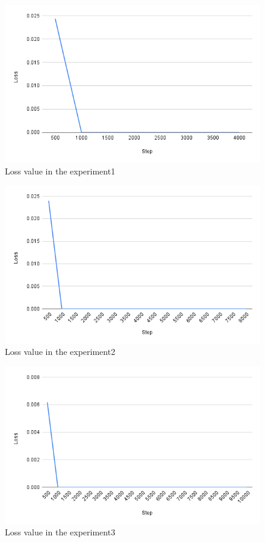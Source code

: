 \begin{figure}[h]
  \centering
  \includegraphics[keepaspectratio, scale=0.5]{images/exp1-4000.png}
  \caption{Loss value in the experiment1}
  \label{Fig:exp1-4000}
  \end{figure}

\begin{figure}[h]
  \centering
  \includegraphics[keepaspectratio, scale=0.5]{images/exp1-8000.png}
  \caption{Loss value in the experiment2}
  \label{Fig:exp1-8000}
  \end{figure}

\begin{figure}[h]
  \centering
  \includegraphics[keepaspectratio, scale=0.5]{images/exp1-10000.png}
  \caption{Loss value in the experiment3}
  \label{Fig:exp1-10000}
  \end{figure}

